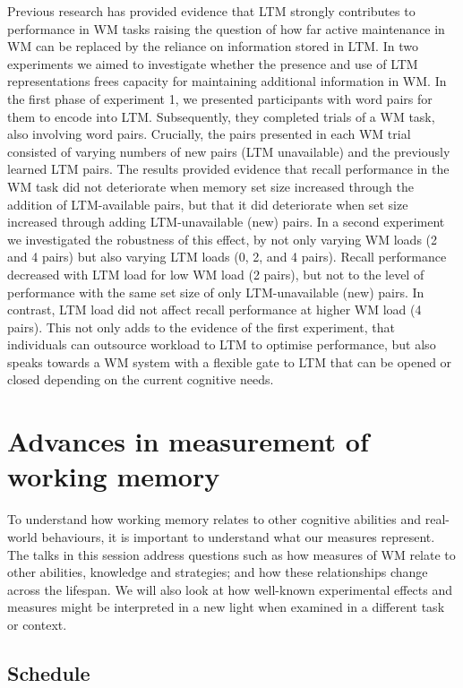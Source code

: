 \documentclass[
  12pt,
]{book}
\begin{document}
Previous research has provided evidence that LTM strongly contributes to performance in WM tasks raising the question of how far active maintenance in WM can be replaced by the reliance on information stored in LTM. In two experiments we aimed to investigate whether the presence and use of LTM representations frees capacity for maintaining additional information in WM. In the first phase of experiment 1, we presented participants with word pairs for them to encode into LTM. Subsequently, they completed trials of a WM task, also involving word pairs. Crucially, the pairs presented in each WM trial consisted of varying numbers of new pairs (LTM unavailable) and the previously learned LTM pairs. The results provided evidence that recall performance in the WM task did not deteriorate when memory set size increased through the addition of LTM-available pairs, but that it did deteriorate when set size increased through adding LTM-unavailable (new) pairs. In a second experiment we investigated the robustness of this effect, by not only varying WM loads (2 and 4 pairs) but also varying LTM loads (0, 2, and 4 pairs). Recall performance decreased with LTM load for low WM load (2 pairs), but not to the level of performance with the same set size of only LTM-unavailable (new) pairs. In contrast, LTM load did not affect recall performance at higher WM load (4 pairs). This not only adds to the evidence of the first experiment, that individuals can outsource workload to LTM to optimise performance, but also speaks towards a WM system with a flexible gate to LTM that can be opened or closed depending on the current cognitive needs.

\hypertarget{advances-in-measurement-of-working-memory}{%
\chapter{Advances in measurement of working memory}\label{advances-in-measurement-of-working-memory}}

To understand how working memory relates to other cognitive abilities and real-world behaviours, it is important to understand what our measures represent. The talks in this session address questions such as how measures of WM relate to other abilities, knowledge and strategies; and how these relationships change across the lifespan. We will also look at how well-known experimental effects and measures might be interpreted in a new light when examined in a different task or context.

\hypertarget{schedule-4}{%
\section{Schedule}\label{schedule-4}}
\end{document}
